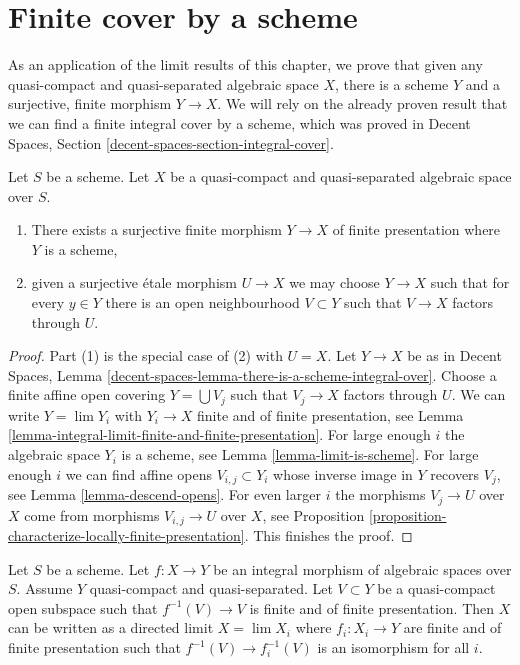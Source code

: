 \section{Finite cover by a scheme}
\label{section-finite-cover}

\noindent
As an application of the limit results of this chapter, we prove that given
any quasi-compact and quasi-separated algebraic space $X$, there is a scheme
$Y$ and a surjective, finite morphism $Y \to X$. We will rely on the already
proven result that we can find a finite integral cover by a scheme, which
was proved in
Decent Spaces, Section \ref{decent-spaces-section-integral-cover}.

\begin{proposition}
\label{proposition-there-is-a-scheme-finite-over}
Let $S$ be a scheme. Let $X$ be a quasi-compact and quasi-separated
algebraic space over $S$.
\begin{enumerate}
\item There exists a surjective finite morphism $Y \to X$
of finite presentation where $Y$ is a scheme,
\item given a surjective \'etale morphism $U \to X$ we may choose
$Y \to X$ such that for every $y \in Y$ there is an open neighbourhood
$V \subset Y$ such that $V \to X$ factors through $U$.
\end{enumerate}
\end{proposition}

\begin{proof}
Part (1) is the special case of (2) with $U = X$.
Let $Y \to X$ be as in
Decent Spaces, Lemma \ref{decent-spaces-lemma-there-is-a-scheme-integral-over}.
Choose a finite affine open covering $Y = \bigcup V_j$ such that $V_j \to X$
factors through $U$. We can write $Y = \lim Y_i$ with
$Y_i \to X$ finite and of finite presentation, see
Lemma \ref{lemma-integral-limit-finite-and-finite-presentation}.
For large enough $i$ the algebraic space $Y_i$ is a scheme, see
Lemma \ref{lemma-limit-is-scheme}.
For large enough $i$ we can find affine opens $V_{i, j} \subset Y_i$
whose inverse image in $Y$ recovers $V_j$, see
Lemma \ref{lemma-descend-opens}.
For even larger $i$ the morphisms $V_j \to U$ over $X$ come
from morphisms $V_{i, j} \to U$ over $X$, see Proposition
\ref{proposition-characterize-locally-finite-presentation}.
This finishes the proof.
\end{proof}

\begin{lemma}
\label{lemma-integral-limit-finite-and-finite-presentation-refined}
Let $S$ be a scheme. Let $f : X \to Y$ be an integral morphism of algebraic
spaces over $S$. Assume $Y$ quasi-compact and quasi-separated.
Let $V \subset Y$ be a quasi-compact open subspace such that
$f^{-1}(V) \to V$ is finite and of finite presentation.
Then $X$ can be written as a directed limit $X = \lim X_i$
where $f_i : X_i \to Y$ are finite and of finite presentation
such that $f^{-1}(V) \to f_i^{-1}(V)$ is an isomorphism for all $i$.
\end{lemma}

